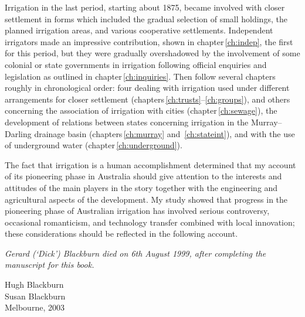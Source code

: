 Irrigation in the last period, starting about 1875, became involved
with closer settlement in forms which included the gradual selection
of small holdings, the planned irrigation areas, and various
cooperative settlements.  Independent irrigators made an impressive
contribution, shown in chapter\,\ref{ch:indep}, the first for this
period, but they were gradually overshadowed by the involvement of
some colonial or state governments in irrigation following official
enquiries and legislation as outlined in chapter\,\ref{ch:inquiries}.
Then follow several chapters roughly in chronological order: four
dealing with irrigation used under different arrangements for closer
settlement (chapters\,\ref{ch:trusts}--\ref{ch:groups}), and others
concerning the association of irrigation with cities
(chapter\,\ref{ch:sewage}), the development of relations between
states concerning irrigation in the Murray--Darling drainage basin
(chapters\,\ref{ch:murray} and~\ref{ch:stateint}), and with the use of
underground water (chapter\,\ref{ch:underground}).

The fact that irrigation is a human accomplishment determined that my
account of its pioneering phase in Australia should give attention to
the interests and attitudes of the main players in the story together
with the engineering and agricultural aspects of the development.  My
study showed that progress in the pioneering phase of Australian
irrigation has involved serious controversy, occasional romanticism,
and technology transfer combined with local innovation; these
considerations should be reflected in the following account.


\vspace{\fill}
{\slshape
\noindent
Gerard (`Dick') Blackburn died on 6th August 1999, after completing
the manuscript for this book.
\begin{flushright}
Hugh Blackburn\\
Susan Blackburn\\[5pt]
Melbourne, 2003
\end{flushright}
}
